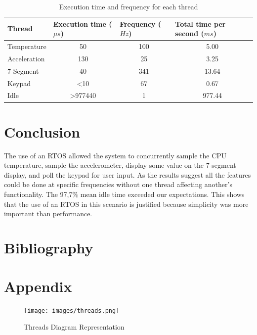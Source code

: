 \documentclass[12pt]{article}
\begin{document}
\begin{table}[!h]
\centering
\caption{Execution time and frequency for each thread}
\label{Table_threads}
\begin{tabular}{|l|c|c|c|}
\hline
\textbf{Thread} & \multicolumn{1}{l|}{\textbf{Execution time ($\mu s$)}} & \multicolumn{1}{l|}{\textbf{Frequency ($Hz$)}} & \multicolumn{1}{l|}{\textbf{Total time per second ($ms$)}} \\ \hline
Temperature & 50 & 100 & 5.00 \\ \hline
Acceleration & 130 & 25 & 3.25 \\ \hline
7-Segment & 40 & 341 & 13.64 \\ \hline
Keypad & \textless10 & 67 & 0.67 \\ \hline
Idle & \textgreater977440 & 1 & 977.44 \\ \hline
\end{tabular}
\end{table}

\newpage

\section{Conclusion}
The use of an RTOS allowed the system to concurrently sample the CPU temperature, sample the accelerometer, display some value on the 7-segment display, and poll the keypad for user input. As the results suggest all the features could be done at specific frequencies without one thread affecting another's functionality. The 97,7\% mean idle time exceeded our expectations.    This shows that the use of an RTOS in this scenario is justified because simplicity was more important than performance.

\newpage
\section{Bibliography}



\newpage
\section{Appendix}
\begin{figure}[!htb]
 \centering
 \texttt{[image: images/threads.png]}
 \caption{Threads Diagram Representation}
 \label{fig:threads}
\end{figure}
\end{document}
